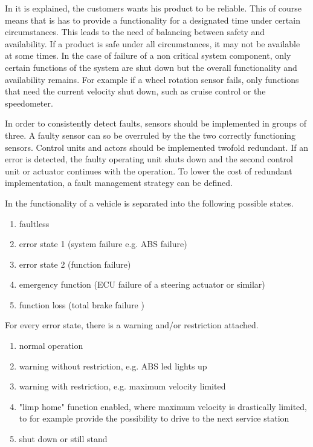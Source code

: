 \documentclass[conference]{IEEEtran}
\begin{document}
In \cite{Lenkungshandbuch} it is explained, the customers wants his product to be reliable. This of course means that is has to provide a functionality for a designated time under certain circumstances. This leads to the need of balancing between safety and availability. If a product is safe under all circumstances, it may not be available at some times. In the case of failure of a non critical system component, only certain functions of the system are shut down but the overall functionality and availability remains. For example if a wheel rotation sensor fails, only functions that need the current velocity shut down, such as cruise control or the speedometer.

In order to consistently detect faults, sensors should be implemented in groups of three. A faulty sensor can so be overruled by the the two correctly functioning sensors. Control units and actors should be implemented twofold redundant. If an error is detected, the faulty operating unit shuts down and the second control unit or actuator continues with the operation. To lower the cost of redundant implementation, a fault management strategy can be defined. 

In \cite{Lenkungshandbuch} the functionality of a vehicle is separated into the following possible states. 
\begin{enumerate}
	\item faultless
	\item error state 1 (system failure e.g. ABS failure)
	\item error state 2 (function failure)
	\item emergency function (ECU failure of a steering actuator or similar)
	\item function loss (total brake failure	)
\end{enumerate}

For every error state, there is a warning and/or restriction attached. 
\begin{enumerate}
	\item normal operation
	\item warning without restriction, e.g. ABS led lights up
	\item warning with restriction, e.g. maximum velocity limited
	\item "limp home" function enabled, where maximum velocity is drastically limited, to for example provide the possibility to drive to the next service station
	\item shut down or still stand
\end{enumerate}
\end{document}

